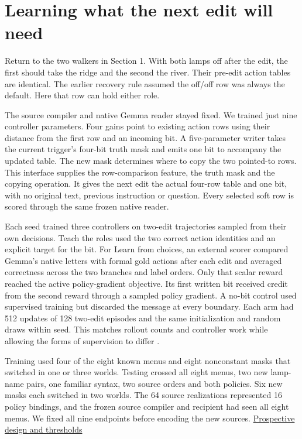 \documentclass[11pt]{article}
\begin{document}
\section{Learning what the next edit will need}

Return to the two walkers in Section 1. With both lamps off after the edit, the first should take the ridge and the second the river. Their pre-edit action tables are identical. The earlier recovery rule assumed the off/off row was always the default. Here that row can hold either role.

The source compiler and native Gemma reader stayed fixed. We trained just nine controller parameters. Four gains point to existing action rows using their distance from the first row and an incoming bit. A five-parameter writer takes the current trigger's four-bit truth mask and emits one bit to accompany the updated table. The new mask determines where to copy the two pointed-to rows. This interface supplies the row-comparison feature, the truth mask and the copying operation. It gives the next edit the actual four-row table and one bit, with no original text, previous instruction or question. Every selected soft row is scored through the same frozen native reader.

Each seed trained three controllers on two-edit trajectories sampled from their own decisions. Teach the roles used the two correct action identities and an explicit target for the bit. For Learn from choices, an external scorer compared Gemma's native letters with formal gold actions after each edit and averaged correctness across the two branches and label orders. Only that scalar reward reached the active policy-gradient objective. Its first written bit received credit from the second reward through a sampled policy gradient. A no-bit control used supervised training but discarded the message at every boundary. Each arm had 512 updates of 128 two-edit episodes and the same initialization and random draws within seed. This matches rollout counts and controller work while allowing the forms of supervision to differ \citep{williams1992reinforce}.

Training used four of the eight known menus and eight nonconstant masks that switched in one or three worlds. Testing crossed all eight menus, two new lamp-name pairs, one familiar syntax, two source orders and both policies. Six new masks each switched in two worlds. The 64 source realizations represented 16 policy bindings, and the frozen source compiler and recipient had seen all eight menus. We fixed all nine endpoints before encoding the new sources. \href{https://github.com/RyoSpiralArchitect/self-fold/blob/v1.0.0/provenance/role_memory_20261104/PLAN.md}{Prospective design and thresholds}
\end{document}
